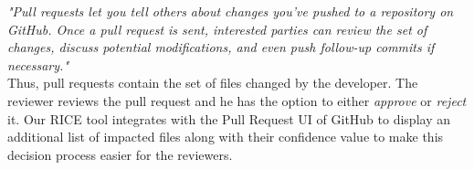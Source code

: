 \textit{"Pull requests let you tell others about changes you've pushed to a repository on GitHub. Once a pull request is sent, interested parties can review the set of changes, discuss potential modifications, and even push follow-up commits if necessary."} ~\cite{GitHub} \\

Thus, pull requests contain the set of files changed by the developer. The reviewer reviews the pull request and he has the option to either \textit{approve} or \textit{reject} it. Our RICE tool integrates with the Pull Request UI of GitHub to display an additional list of impacted files along with their confidence value to make this decision process easier for the reviewers.   


